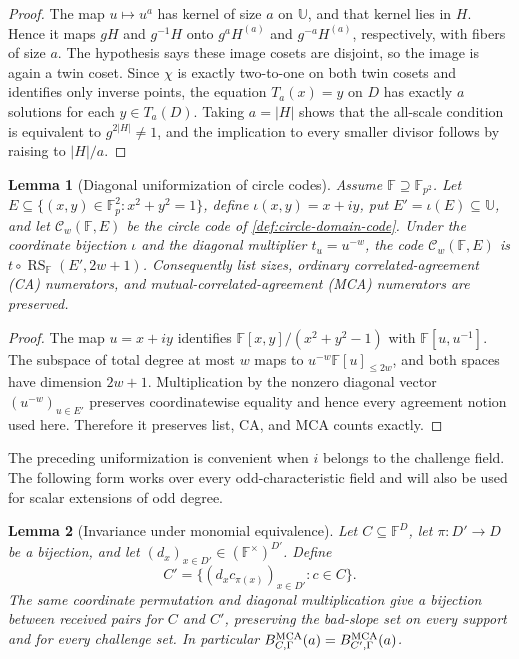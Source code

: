 \documentclass[11pt,a4paper]{amsart}
\numberwithin{equation}{section}
\newtheorem{lemma}[lemma]{Lemma}
\theoremstyle{remark}
\DeclareMathOperator{\RS}{RS}
\newcommand{\F}{\mathbb F}
\newcommand{\Ccal}{\mathcal C}
\newcommand{\UU}{\mathbb U}
\newcommand{\abs}[1]{\lvert #1\rvert}
\begin{document}
\begin{proof}
The map \(u\mapsto u^a\) has kernel of size \(a\) on \(\UU\), and that kernel lies in \(H\).  Hence it maps \(gH\) and \(g^{-1}H\) onto \(g^aH^{(a)}\) and \(g^{-a}H^{(a)}\), respectively, with fibers of size \(a\).  The hypothesis says these image cosets are disjoint, so the image is again a twin coset.  Since \(\chi\) is exactly two-to-one on both twin cosets and identifies only inverse points, the equation \(T_a(x)=y\) on \(D\) has exactly \(a\) solutions for each \(y\in T_a(D)\).  Taking \(a=\abs H\) shows that the all-scale condition is equivalent to \(g^{2\abs H}\ne1\), and the implication to every smaller divisor follows by raising to \(\abs H/a\).
\end{proof}

\begin{lemma}[Diagonal uniformization of circle codes]\label{lem:circle-uniformization}
Assume \(\F\supseteq\F_{p^2}\).  Let
\(E\subseteq\{(x,y)\in\F_p^2:x^2+y^2=1\}\), define
\(\iota(x,y)=x+iy\), put \(E'=\iota(E)\subseteq\UU\), and let
\(\Ccal_w(\F,E)\) be the circle code of
\cref{def:circle-domain-code}.  Under the coordinate bijection \(\iota\)
and the diagonal multiplier \(t_u=u^{-w}\), the code
\(\Ccal_w(\F,E)\) is \(t\circ\RS_\F(E',2w+1)\).
Consequently list sizes, ordinary correlated-agreement (CA) numerators,
and mutual-correlated-agreement (MCA) numerators are preserved.
\end{lemma}

\begin{proof}
The map \(u=x+iy\) identifies \(\F[x,y]/(x^2+y^2-1)\) with \(\F[u,u^{-1}]\).  The subspace of total degree at most \(w\) maps to \(u^{-w}\F[u]_{\le2w}\), and both spaces have dimension \(2w+1\).  Multiplication by the nonzero diagonal vector \((u^{-w})_{u\in E'}\) preserves coordinatewise equality and hence every agreement notion used here.  Therefore it preserves list, CA, and MCA counts exactly.
\end{proof}

The preceding uniformization is convenient when \(i\) belongs to the
challenge field.  The following form works over every odd-characteristic
field and will also be used for scalar extensions of odd degree.

\begin{lemma}[Invariance under monomial equivalence]
\label{lem:monomial-mca-invariance}
Let \(C\subseteq\F^D\), let \(\pi:D'\to D\) be a bijection, and let
\((d_x)_{x\in D'}\in(\F^\times)^{D'}\).  Define
\[
 C'=\{(d_xc_{\pi(x)})_{x\in D'}:c\in C\}.
\]
The same coordinate permutation and diagonal multiplication give a
bijection between received pairs for \(C\) and \(C'\), preserving the
bad-slope set on every support and for every challenge set.  In
particular \(B_{C,\Gamma}^{\rm MCA}(a)=B_{C',\Gamma}^{\rm MCA}(a)\).
\end{lemma}
\end{document}
